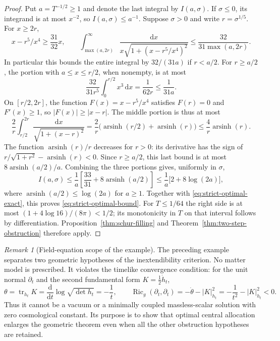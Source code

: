 \documentclass[10pt,a4paper]{article}
\numberwithin{equation}{section}
\theoremstyle{definition}
\theoremstyle{remark}
\newtheorem{remark}[theorem]{Remark}
\newcommand{\dd}{\mathrm d}
\begin{document}
\begin{proof}
Put $a=T^{-1/2}\ge1$ and denote the last integral by $I(a,\sigma)$.
If $\sigma\le0$, its integrand is at most $x^{-2}$, so
$I(a,\sigma)\le a^{-1}$.  Suppose $\sigma>0$ and write
$r=\sigma^{1/5}$.  For $x\ge2r$,
\[
 x-r^5/x^4\ge\frac{31}{32}x,\qquad
 \int_{\max(a,2r)}^\infty
 \frac{\dd x}{x\sqrt{1+(x-r^5/x^4)^2}}
 \le\frac{32}{31\max(a,2r)}.
\]
In particular this bounds the entire integral by $32/(31a)$ if
$r<a/2$.  For $r\ge a/2$, the portion with $a\le x\le r/2$,
when nonempty, is at most
\[
 \frac{32}{31r^5}\int_0^{r/2}x^3\,\dd x
 =\frac1{62r}\le\frac1{31a}.
\]
On $[r/2,2r]$, the function $F(x)=x-r^5/x^4$ satisfies
$F(r)=0$ and $F'(x)\ge1$, so $|F(x)|\ge|x-r|$.
The middle portion is thus at most
\[
 \frac2r\int_{r/2}^{2r}\frac{\dd x}{\sqrt{1+(x-r)^2}}
 =\frac2r\bigl(\operatorname{arsinh}(r/2)
                         +\operatorname{arsinh}(r)\bigr)
 \le\frac4r\operatorname{arsinh}(r).
\]
The function $\operatorname{arsinh}(r)/r$ decreases for $r>0$:
its derivative has the sign of
$r/\sqrt{1+r^2}-\operatorname{arsinh}(r)<0$.
Since $r\ge a/2$, this last bound is at most
$8\operatorname{arsinh}(a/2)/a$.  Combining the three portions gives,
uniformly in $\sigma$,
\[
 I(a,\sigma)
 \le\frac1a\left[\frac{33}{31}
                   +8\operatorname{arsinh}(a/2)\right]
 \le\frac1a\bigl[2+8\log(2a)\bigr],
\]
where $\operatorname{arsinh}(a/2)\le\log(2a)$ for $a\ge1$.
Together with \eqref{eq:strict-optimal-exact}, this proves
\eqref{eq:strict-optimal-bound}.
For $T\le1/64$ the right side is at most
$(1+4\log16)/(8\pi)<1/2$; its monotonicity in $T$ on that interval
follows by differentiation.  Proposition~\ref{thm:schur-filling}
and Theorem~\ref{thm:two-step-obstruction} therefore apply.
\end{proof}

\begin{remark}[Field-equation scope of the example]
The preceding example separates two geometric hypotheses of the
inextendibility criterion.  No matter model is prescribed.
It violates the timelike convergence condition: for the unit normal
$\partial_t$ and the second fundamental form $K=\frac12\dot h_t$,
\[
 \theta=\operatorname{tr}_{h_t}K
        =\frac{\dd}{\dd t}\log\sqrt{\det h_t}=-\frac1t,
 \qquad
 \operatorname{Ric}_g(\partial_t,\partial_t)
       =-\dot\theta-|K|_{h_t}^2
       =-\frac1{t^2}-|K|_{h_t}^2<0.
\]
Thus it cannot be a vacuum or a minimally coupled massless-scalar
solution with zero cosmological constant.  Its purpose is to show that
optimal central allocation enlarges the geometric theorem even when
all the other obstruction hypotheses are retained.
\end{remark}
\end{document}
